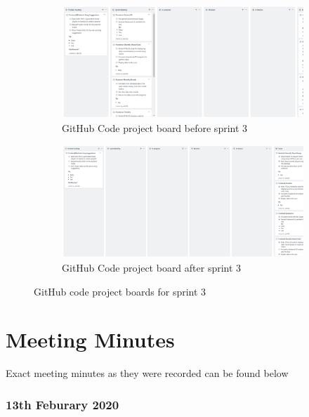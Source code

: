 \documentclass[10pt, notitlepage]{report}
\begin{document}
\begin{figure}[!h]
\centering
\begin{subfigure}{\textwidth}
	\centering	
	\includegraphics[width=1\linewidth]{git-code-3-before.png}
	\caption{GitHub Code project board before sprint 3}
	\label{fig:agileapp-cb3}
\end{subfigure}
\begin{subfigure}{\textwidth}
	\centering	
	\includegraphics[width=1\linewidth]{git-code-3-after.png}
	\caption{GitHub Code project board after sprint 3}
	\label{fig:agileapp-ca3}
\end{subfigure}

\caption{GitHub code project boards for sprint 3}

\end{figure}
\newpage


\section{Meeting Minutes}

Exact meeting minutes as they were recorded can be found below\\

\subsubsection{13th Feburary 2020}
\end{document}
